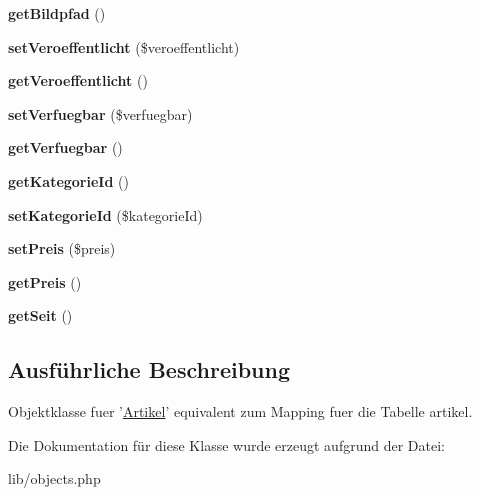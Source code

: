 \begin{DoxyCompactItemize}
\item 
\hypertarget{classArtikel_aad17675985534337a75b24f36fe7fb0b}{{\bfseries get\-Bildpfad} ()}\label{classArtikel_aad17675985534337a75b24f36fe7fb0b}

\item 
\hypertarget{classArtikel_abc4ddccc3c1597dd8367f733b4537999}{{\bfseries set\-Veroeffentlicht} (\$veroeffentlicht)}\label{classArtikel_abc4ddccc3c1597dd8367f733b4537999}

\item 
\hypertarget{classArtikel_a6e03b9f9bb79ad2b2471b96437c98a6f}{{\bfseries get\-Veroeffentlicht} ()}\label{classArtikel_a6e03b9f9bb79ad2b2471b96437c98a6f}

\item 
\hypertarget{classArtikel_abb6b0283547bb07656d5809ee577bdce}{{\bfseries set\-Verfuegbar} (\$verfuegbar)}\label{classArtikel_abb6b0283547bb07656d5809ee577bdce}

\item 
\hypertarget{classArtikel_a45b627212caa13e05484d74fe02479dc}{{\bfseries get\-Verfuegbar} ()}\label{classArtikel_a45b627212caa13e05484d74fe02479dc}

\item 
\hypertarget{classArtikel_aae722ab125e420f3852cdb77c6bb163c}{{\bfseries get\-Kategorie\-Id} ()}\label{classArtikel_aae722ab125e420f3852cdb77c6bb163c}

\item 
\hypertarget{classArtikel_a2df30fe95eaeffcb62af420ce238cbec}{{\bfseries set\-Kategorie\-Id} (\$kategorie\-Id)}\label{classArtikel_a2df30fe95eaeffcb62af420ce238cbec}

\item 
\hypertarget{classArtikel_a2dcaa914ee5faa9d43c1ecd528cdfa6e}{{\bfseries set\-Preis} (\$preis)}\label{classArtikel_a2dcaa914ee5faa9d43c1ecd528cdfa6e}

\item 
\hypertarget{classArtikel_ae169c639a0a5be1ad87eb893949fea11}{{\bfseries get\-Preis} ()}\label{classArtikel_ae169c639a0a5be1ad87eb893949fea11}

\item 
\hypertarget{classArtikel_aa80094f9ad33453c4506eb6f71fa43f8}{{\bfseries get\-Seit} ()}\label{classArtikel_aa80094f9ad33453c4506eb6f71fa43f8}

\end{DoxyCompactItemize}


\subsection{\-Ausführliche \-Beschreibung}
\-Objektklasse fuer '\hyperlink{classArtikel}{\-Artikel}' equivalent zum \-Mapping fuer die \-Tabelle artikel. 

\-Die \-Dokumentation für diese \-Klasse wurde erzeugt aufgrund der \-Datei\-:\begin{DoxyCompactItemize}
\item 
lib/objects.\-php\end{DoxyCompactItemize}
